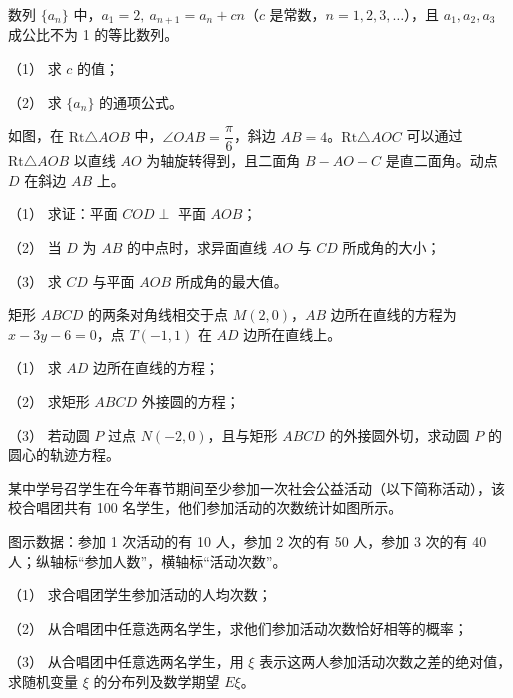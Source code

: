 \begin{question}
数列 $\{a_n\}$ 中，$a_1=2,\ a_{n+1}=a_n+cn$（$c$ 是常数，$n=1,2,3,\ldots$），且 $a_1,a_2,a_3$ 成公比不为 1 的等比数列。

（1） 求 $c$ 的值；

（2） 求 $\{a_n\}$ 的通项公式。

\Needspace{0.4\textheight}
\end{question}
\begin{question}
如图，在 $\mathrm{Rt}\triangle AOB$ 中，$\angle OAB=\dfrac{\pi}{6}$，斜边 $AB=4$。$\mathrm{Rt}\triangle AOC$ 可以通过 $\mathrm{Rt}\triangle AOB$ 以直线 $AO$ 为轴旋转得到，且二面角 $B-AO-C$ 是直二面角。动点 $D$ 在斜边 $AB$ 上。

（1） 求证：平面 $COD\perp$ 平面 $AOB$；

（2） 当 $D$ 为 $AB$ 的中点时，求异面直线 $AO$ 与 $CD$ 所成角的大小；

（3） 求 $CD$ 与平面 $AOB$ 所成角的最大值。
\nopagebreak[4]
\begin{center}\end{center}
\nopagebreak[4]
\end{question}
\begin{question}
矩形 $ABCD$ 的两条对角线相交于点 $M(2,0)$，$AB$ 边所在直线的方程为 $x-3y-6=0$，点 $T(-1,1)$ 在 $AD$ 边所在直线上。

（1） 求 $AD$ 边所在直线的方程；

（2） 求矩形 $ABCD$ 外接圆的方程；

（3） 若动圆 $P$ 过点 $N(-2,0)$，且与矩形 $ABCD$ 的外接圆外切，求动圆 $P$ 的圆心的轨迹方程。

\Needspace{0.4\textheight}
\end{question}
\begin{question}
某中学号召学生在今年春节期间至少参加一次社会公益活动（以下简称活动），该校合唱团共有 100 名学生，他们参加活动的次数统计如图所示。

图示数据：参加 1 次活动的有 10 人，参加 2 次的有 50 人，参加 3 次的有 40 人；纵轴标“参加人数”，横轴标“活动次数”。

（1） 求合唱团学生参加活动的人均次数；

（2） 从合唱团中任意选两名学生，求他们参加活动次数恰好相等的概率；

（3） 从合唱团中任意选两名学生，用 $\xi$ 表示这两人参加活动次数之差的绝对值，求随机变量 $\xi$ 的分布列及数学期望 $E\xi$。
\nopagebreak[4]
\begin{center}\end{center}
\nopagebreak[4]
\Needspace{0.4\textheight}
\end{question}

